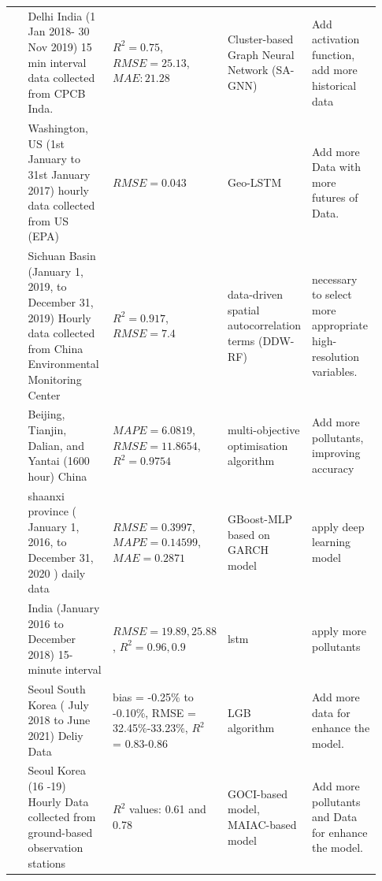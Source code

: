 \documentclass[a4paper, fleqn]{cas-sc}
\theoremstyle{definition}
\theoremstyle{remark}
\begin{document}
\begin{landscape}
{\begin{longtable}[h!]{ p{0.12\linewidth} p{0.27\linewidth} p{0.16\linewidth} p{0.16\linewidth} p{0.22\linewidth} }
 \cite{MANDAL2023137036} & Delhi India (1 Jan 2018- 30 Nov 2019) 15 min interval data collected from CPCB Inda. &$R^2=0.75$,  $RMSE=25.13$,  $MAE: 21.28$ & Cluster-based Graph Neural Network (SA-GNN) & Add activation function, add more historical data \\
 \cite{MA2019117729} & Washington, US (1st January to 31st January 2017) hourly data collected from US (EPA) & $RMSE = 0.043$ & Geo-LSTM & Add more Data with more futures of Data.  \\
 \cite{ZHANG2022134890}& Sichuan Basin (January 1,  2019,  to December 31,  2019) Hourly data collected from  China Environmental Monitoring Center  & $R^2= 0.917$, $RMSE=7.4$ & data-driven spatial autocorrelation terms (DDW-RF) & necessary to select more appropriate high-resolution variables. \\
\cite{TIAN2022134048} & Beijing,  Tianjin,  Dalian,  and Yantai (1600 hour) China & $MAPE=6.0819$, $RMSE=11.8654$, $R^2=0.9754$ &  multi-objective optimisation algorithm & Add more pollutants, improving accuracy \\
\cite{DAI2022131898} &shaanxi province ( January 1,  2016, to December 31,  2020 ) daily data & $RMSE=0.3997$, $MAPE=0.14599$, $MAE=0.2871$ &GBoost-MLP based on GARCH model & apply deep learning model \\ 
\cite{AGGARWAL2021129660} & India (January 2016 to December 2018) 15-minute interval  & $RMSE=19.89, 25.88$ ,  $R^2=0.96, 0.9$ &lstm&apply more pollutants \\

 \cite{kim2022short}         & Seoul South Korea ( July 2018 to   June 2021) Deliy Data                                                 & bias = -0.25\% to -0.10\%,  RMSE =   32.45\%-33.23\%,  $R^2$ = 0.83-0.86                                     & LGB algorithm                                                       & Add more data for enhance the model.                                                                            \\





  \cite{lee2021potential}            & Seoul Korea (16 -19) Hourly Data collected from ground-based observation stations                      & $R^2$ values:  0.61 and 0.78                                                                                & GOCI-based model, MAIAC-based model                                & Add more pollutants and Data for enhance the model.                                                                   \\





\end{longtable}}
\end{landscape}
\end{document}

